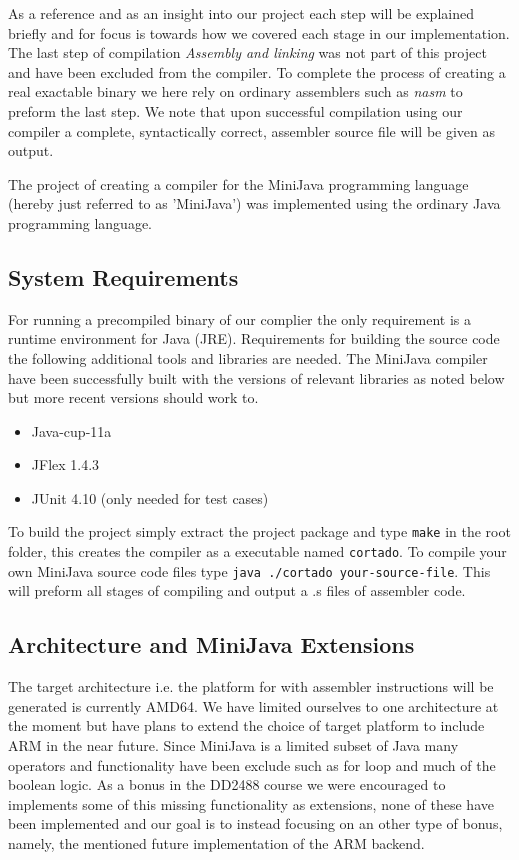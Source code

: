\documentclass[11pt]{amsart}
\begin{document}
As a reference and as an insight into our project each step will be explained briefly and for focus is towards how we covered each stage in our implementation. The last step of compilation \textit{Assembly and linking} was not part of this project and have been excluded from the compiler. To complete the process of creating a real exactable binary we here rely on ordinary assemblers such as \textit{nasm}\cite{nasm} to preform the last step. We note that upon successful compilation using our compiler a complete, syntactically correct, assembler source file will be given as output.

The project of creating a compiler for the MiniJava programming language (hereby just referred to as 'MiniJava') was implemented using the ordinary Java programming language. 

\subsection{System Requirements}
For running a precompiled binary of our complier the only requirement is a runtime environment for Java (JRE). Requirements for building the source code the following additional tools and libraries are needed. The MiniJava compiler have been successfully built with the versions of relevant libraries as noted below but more recent versions should work to.

\begin{itemize}
\item Java-cup-11a
\item JFlex 1.4.3
\item JUnit 4.10 (only needed for test cases)
\end{itemize}

To build the project simply extract the project package and type \texttt{make} in the root folder, this creates the compiler as a executable named \texttt{cortado}. To compile your own MiniJava source code files type \texttt{java ./cortado your-source-file}. This will preform all stages of compiling and output a .s files of assembler code.

\subsection{Architecture and MiniJava Extensions}
The target architecture i.e. the platform for with assembler instructions will be generated is currently AMD64. We have limited ourselves to one architecture at the moment but have plans to extend the choice of target platform to include ARM in the near future. Since MiniJava is a limited subset of Java many operators and functionality have been exclude such as for loop and much of the boolean logic. As a bonus in the DD2488 course we were encouraged to implements some of this missing functionality as extensions, none of these have been implemented and our goal is to instead focusing on an other type of bonus, namely, the mentioned future implementation of the ARM backend.
\end{document}
